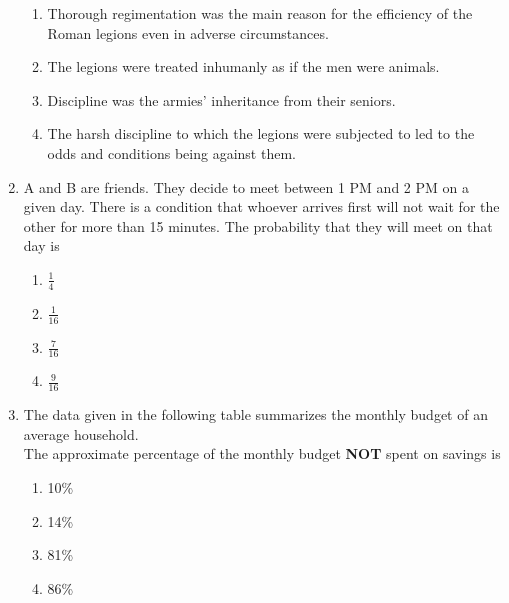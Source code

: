 \documentclass[journal]{IEEEtran}
\begin{document}
\begin{enumerate}
{				\begin{enumerate}
					\item	Thorough regimentation was the main reason for the efficiency of the Roman legions even in
					adverse circumstances.
					\item The legions were treated inhumanly as if the men were animals.
					\item Discipline was the armies’ inheritance from their seniors.
					\item The harsh discipline to which the legions were subjected to led to the odds and conditions being
					against them.
				\end{enumerate}
        
        }
    \item{
        
           	A and B are friends. They decide to meet between 1 PM and 2 PM on a given day. There is a
           	condition that whoever arrives first will not wait for the other for more than 15 minutes. The
           	probability that they will meet on that day is
             \text{   }\hfill
                
			
			\begin{multicols}{4}
				\begin{enumerate}
					\item $\frac{1}{4}$
					\item $\frac{1}{16}$
					\item $\frac{7}{16}$
					\item $\frac{9}{16}$
				\end{enumerate}
			\end{multicols}
        
        }
    \item{
	
			The data given in the following table summarizes the monthly budget of an average household. \\
			 The approximate percentage of the monthly budget \textbf{NOT} spent on savings is
			\text{   }\hfill
			
			\begin{multicols}{2}
				\begin{enumerate}
					\item 10\%
					
					\item 14\%
					 
					\item 81\%
					
					\item 86\%
				\end{enumerate}
			\end{multicols}
			
		}
  
    \end{enumerate}
\end{document}
